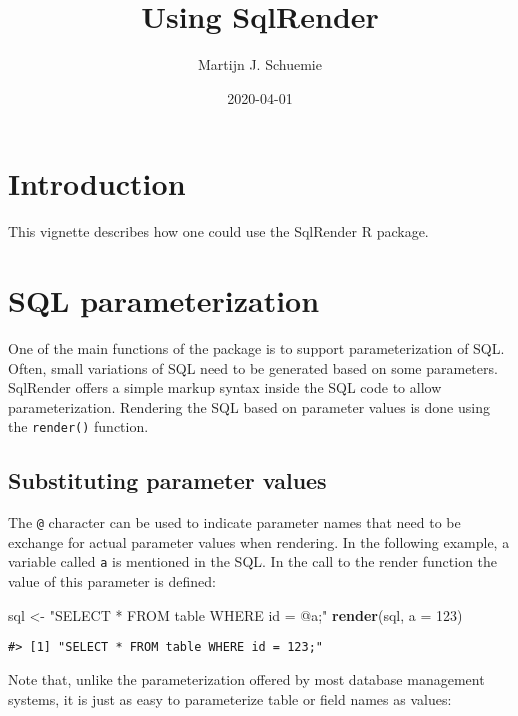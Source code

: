 \documentclass[
]{article}
\title{Using SqlRender}
\author{Martijn J. Schuemie}
\date{2020-04-01}
\newenvironment{Shaded}{\begin{snugshade}}{\end{snugshade}}
\newcommand{\DataTypeTok}[1]{\textcolor[rgb]{0.13,0.29,0.53}{#1}}
\newcommand{\DecValTok}[1]{\textcolor[rgb]{0.00,0.00,0.81}{#1}}
\newcommand{\KeywordTok}[1]{\textcolor[rgb]{0.13,0.29,0.53}{\textbf{#1}}}
\newcommand{\NormalTok}[1]{#1}
\newcommand{\StringTok}[1]{\textcolor[rgb]{0.31,0.60,0.02}{#1}}
\begin{document}
\maketitle

{
\setcounter{tocdepth}{2}
\tableofcontents
}
\hypertarget{introduction}{%
\section{Introduction}\label{introduction}}

This vignette describes how one could use the SqlRender R package.

\hypertarget{sql-parameterization}{%
\section{SQL parameterization}\label{sql-parameterization}}

One of the main functions of the package is to support parameterization
of SQL. Often, small variations of SQL need to be generated based on
some parameters. SqlRender offers a simple markup syntax inside the SQL
code to allow parameterization. Rendering the SQL based on parameter
values is done using the \texttt{render()} function.

\hypertarget{substituting-parameter-values}{%
\subsection{Substituting parameter
values}\label{substituting-parameter-values}}

The \texttt{@} character can be used to indicate parameter names that
need to be exchange for actual parameter values when rendering. In the
following example, a variable called \texttt{a} is mentioned in the SQL.
In the call to the render function the value of this parameter is
defined:

\begin{Shaded}
\begin{Highlighting}[]
\NormalTok{sql <-}\StringTok{ "SELECT * FROM table WHERE id = @a;"}
\KeywordTok{render}\NormalTok{(sql, }\DataTypeTok{a =} \DecValTok{123}\NormalTok{)}
\end{Highlighting}
\end{Shaded}

\begin{verbatim}
#> [1] "SELECT * FROM table WHERE id = 123;"
\end{verbatim}

Note that, unlike the parameterization offered by most database
management systems, it is just as easy to parameterize table or field
names as values:
\end{document}
